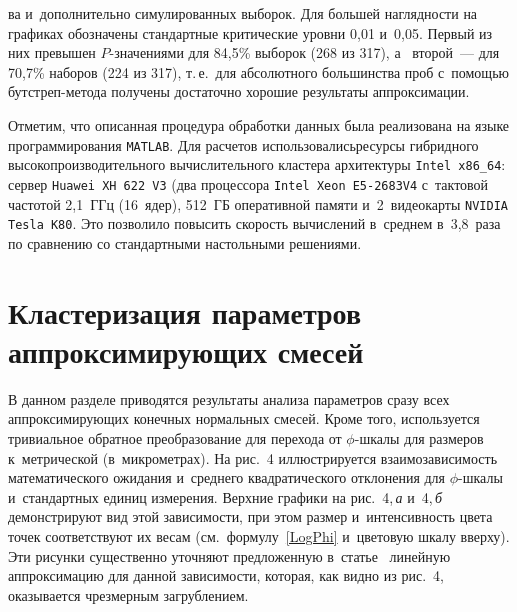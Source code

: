 \begin{multicols}{2}

\noindent
ва и~дополнительно симулированных выборок. Для 
большей наглядности на графиках обозначены стандартные критические уровни 
0{,}01 и~0{,}05. Первый из них превышен $P$-зна\-че\-ни\-ями для 84{,}5\% 
выборок (268 из 317), а~ второй~--- для 70{,}7\% наборов (224 из 317), т.\,е.\
 для абсолютного большинства проб с~помощью бут\-стреп-ме\-то\-да 
получены достаточно хорошие результаты аппроксимации.



Отметим, что описанная процедура обработки данных была реализована на 
языке про\-грам\-ми\-ро\-ва\-ния \verb"MATLAB". Для расчетов использовались\linebreak ресурсы 
гибридного высокопроизводительного вычислительного кластера архитектуры 
\verb"Intel x86_64": сервер \verb"Huawei XH 622 V3" (два процессора 
\verb"Intel Xeon E5-2683V4" с~тактовой частотой 2{,}1~ГГц (16~ядер), 
512~ГБ оперативной памяти и~2~видеокарты \verb"NVIDIA Tesla K80". Это 
позволило повысить скорость вычислений в~среднем в~3{,}8~раза по 
сравнению со стандартными настольными решениями.


\section{Кластеризация параметров аппроксимирующих смесей}

\vspace*{-12pt}

В данном разделе приводятся результаты анализа параметров сразу всех 
аппроксимирующих конечных нормальных смесей. Кроме того, используется 
тривиальное обратное преобразование для перехода от $\phi$-шкалы для 
размеров к~метрической (в~микрометрах). На рис.~4 иллюстрируется взаимозависимость 
математического ожидания и~среднего квадратического отклонения для 
$\phi$-шкалы и~стандартных единиц измерения. Верхние графики на рис.~4,\,\textit{а} 
и~4,\,\textit{б} демонстрируют вид этой за\-ви\-си\-мости, при этом размер 
и~интенсивность цвета точек соответствуют их весам (см.\ 
формулу~\eqref{LogPhi} и~цветовую
шкалу вверху). Эти рисунки существенно уточняют предложенную 
в~статье~\cite{Slyuta2014} линейную аппроксимацию для данной за\-ви\-си\-мости, 
которая, как видно из рис.~4, оказывается чрезмерным загрублением.

\pagebreak

\end{multicols}

